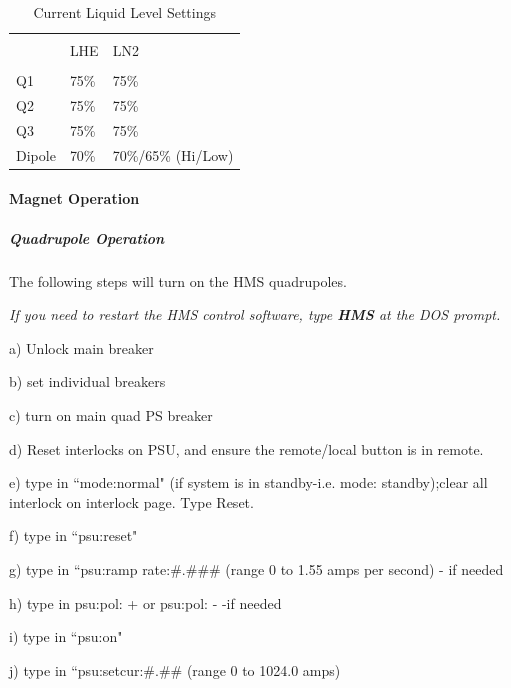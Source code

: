 \begin{table}
\begin{center}
\caption{Current Liquid Level Settings\label{tab:liq_levels}}
\vspace{\baselineskip}
\begin{tabular}{|l|l|l|}
\hline
{} & {}  & {}  \\
{} & LHE & LN2 \\
{} & {}  & {}  \\ \hline
Q1  & 75\% & 75\% \\
Q2  & 75\% & 75\% \\
Q3  & 75\% & 75\% \\
Dipole& 70\% & 70\%/65\% (Hi/Low) \\
\hline
\end{tabular}
\end{center}
\end{table}

\paragraph{Magnet Operation}

\subparagraph{Quadrupole Operation}

\begin{description}
\item{}\hskip0.3in The following steps will turn on the HMS
quadrupoles.
\end{description}
{\sl If you need to restart the HMS control software, type {\bf HMS} at the DOS prompt.}

\begin{description}
\item{}\hskip0.5in a) Unlock main breaker
\item{}\hskip0.5in b) set individual breakers
\item{}\hskip0.5in c) turn on main quad PS breaker
\item{}\hskip0.5in d) Reset interlocks on PSU, and ensure the
remote/local button is in remote.
\item{}\hskip0.5in e) type in ``mode:normal" (if system is in
standby-i.e. mode: standby);clear all interlock on interlock
page.  Type Reset.
\item{}\hskip0.5in f) type in ``psu:reset"
\item{}\hskip0.5in g) type in ``psu:ramp rate:\#.\#\#\# (range 0 to 1.55
amps per second)
- if needed
\item{}\hskip0.5in {h) type in psu:pol: + or psu:pol: - \quad -if needed}
\item{}\hskip0.5in i) type in ``psu:on"
\item{}\hskip0.5in j) type in ``psu:setcur:\#.\#\# (range 0 to 1024.0 amps)
\end{description}

